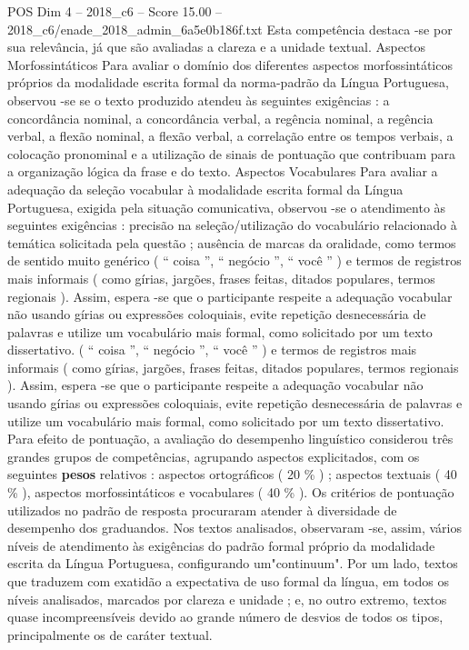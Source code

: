 \begin{textsample}{POS Dim 4 – 2018\_c6 – Score 15.00 – 2018\_c6/enade\_2018\_admin\_6a5e0b186f.txt}
Esta competência destaca -se por sua relevância, já que são avaliadas a clareza e a unidade textual.
Aspectos Morfossintáticos Para avaliar o domínio dos diferentes aspectos morfossintáticos próprios da modalidade escrita formal da norma-padrão da Língua Portuguesa, observou -se se o texto produzido atendeu às seguintes exigências : a concordância nominal, a concordância verbal, a regência nominal, a regência verbal, a flexão nominal, a flexão verbal, a correlação entre os tempos verbais, a colocação pronominal e a utilização de sinais de pontuação que contribuam para a organização lógica da frase e do texto.
Aspectos Vocabulares Para avaliar a adequação da seleção vocabular à modalidade escrita formal da Língua Portuguesa, exigida pela situação comunicativa, observou -se o atendimento às seguintes exigências : precisão na seleção/utilização do vocabulário relacionado à temática solicitada pela questão ; ausência de marcas da oralidade, como termos de sentido muito genérico ( “ coisa ”, “ negócio ”, “ você ” ) e termos de registros mais informais ( como gírias, jargões, frases feitas, ditados populares, termos regionais ).
Assim, espera -se que o participante respeite a adequação vocabular não usando gírias ou expressões coloquiais, evite repetição desnecessária de palavras e utilize um vocabulário mais formal, como solicitado por um texto dissertativo. ( “ coisa ”, “ negócio ”, “ você ” ) e termos de registros mais informais ( como gírias, jargões, frases feitas, ditados populares, termos regionais ).
Assim, espera -se que o participante respeite a adequação vocabular não usando gírias ou expressões coloquiais, evite repetição desnecessária de palavras e utilize um vocabulário mais formal, como solicitado por um texto dissertativo.
Para efeito de pontuação, a avaliação do desempenho linguístico considerou três grandes grupos de competências, agrupando aspectos explicitados, com os seguintes \textbf{pesos} relativos : aspectos ortográficos ( 20 \% ) ; aspectos textuais ( 40 \% ), aspectos morfossintáticos e vocabulares ( 40 \% ).
Os critérios de pontuação utilizados no padrão de resposta procuraram atender à diversidade de desempenho dos graduandos.
Nos textos analisados, observaram -se, assim, vários níveis de atendimento às exigências do padrão formal próprio da modalidade escrita da Língua Portuguesa, configurando um"continuum".
Por um lado, textos que traduzem com exatidão a expectativa de uso formal da língua, em todos os níveis analisados, marcados por clareza e unidade ; e, no outro extremo, textos quase incompreensíveis devido ao grande número de desvios de todos os tipos, principalmente os de caráter textual.

\end{textsample}
